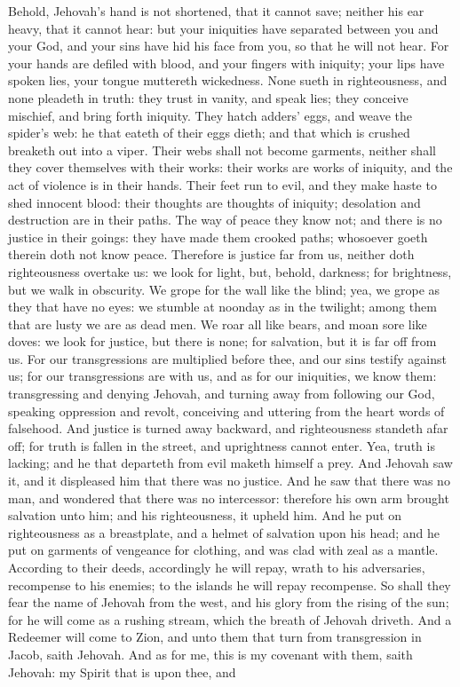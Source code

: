 Behold, Jehovah’s hand is not shortened, that it cannot save; neither his ear heavy, that it cannot hear: but your iniquities have separated between you and your God, and your sins have hid his face from you, so that he will not hear. For your hands are defiled with blood, and your fingers with iniquity; your lips have spoken lies, your tongue muttereth wickedness. None sueth in righteousness, and none pleadeth in truth: they trust in vanity, and speak lies; they conceive mischief, and bring forth iniquity. They hatch adders’ eggs, and weave the spider’s web: he that eateth of their eggs dieth; and that which is crushed breaketh out into a viper. Their webs shall not become garments, neither shall they cover themselves with their works: their works are works of iniquity, and the act of violence is in their hands. Their feet run to evil, and they make haste to shed innocent blood: their thoughts are thoughts of iniquity; desolation and destruction are in their paths. The way of peace they know not; and there is no justice in their goings: they have made them crooked paths; whosoever goeth therein doth not know peace.  Therefore is justice far from us, neither doth righteousness overtake us: we look for light, but, behold, darkness; for brightness, but we walk in obscurity. We grope for the wall like the blind; yea, we grope as they that have no eyes: we stumble at noonday as in the twilight; among them that are lusty we are as dead men. We roar all like bears, and moan sore like doves: we look for justice, but there is none; for salvation, but it is far off from us. For our transgressions are multiplied before thee, and our sins testify against us; for our transgressions are with us, and as for our iniquities, we know them: transgressing and denying Jehovah, and turning away from following our God, speaking oppression and revolt, conceiving and uttering from the heart words of falsehood. And justice is turned away backward, and righteousness standeth afar off; for truth is fallen in the street, and uprightness cannot enter. Yea, truth is lacking; and he that departeth from evil maketh himself a prey. And Jehovah saw it, and it displeased him that there was no justice. And he saw that there was no man, and wondered that there was no intercessor: therefore his own arm brought salvation unto him; and his righteousness, it upheld him. And he put on righteousness as a breastplate, and a helmet of salvation upon his head; and he put on garments of vengeance for clothing, and was clad with zeal as a mantle. According to their deeds, accordingly he will repay, wrath to his adversaries, recompense to his enemies; to the islands he will repay recompense. So shall they fear the name of Jehovah from the west, and his glory from the rising of the sun; for he will come as a rushing stream, which the breath of Jehovah driveth. And a Redeemer will come to Zion, and unto them that turn from transgression in Jacob, saith Jehovah. And as for me, this is my covenant with them, saith Jehovah: my Spirit that is upon thee, and 